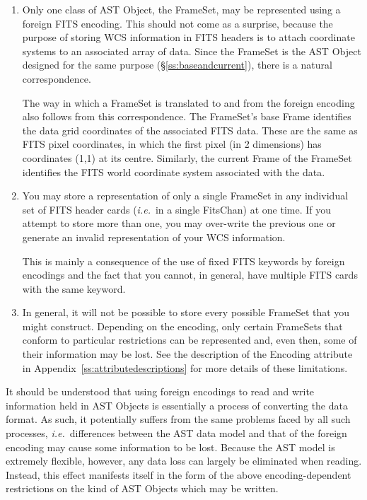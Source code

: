 \documentclass[twoside,11pt]{starlink}
\providecommand{\appref}[1]{Appendix~\ref{#1}}
\providecommand{\secref}[1]{\S\ref{#1}}
\begin{document}
\begin{enumerate}
\item Only one class of AST Object, the FrameSet, may be represented
using a foreign FITS encoding. This should not come as a surprise,
because the purpose of storing WCS information in FITS headers is to
attach coordinate systems to an associated array of data. Since the
FrameSet is the AST Object designed for the same purpose
(\secref{ss:baseandcurrent}), there is a natural correspondence.

The way in which a FrameSet is translated to and from the foreign
encoding also follows from this correspondence. The FrameSet's base
Frame identifies the data grid coordinates of the associated FITS
data. These are the same as FITS pixel coordinates, in which the first
pixel (in 2 dimensions) has coordinates (1,1) at its
centre. Similarly, the current Frame of the FrameSet identifies the
FITS world coordinate system associated with the data.

\item You may store a representation of only a single FrameSet in any
individual set of FITS header cards (\emph{i.e.}\ in a single
FitsChan) at one time. If you attempt to store more than one, you may
over-write the previous one or generate an invalid representation of
your WCS information.

This is mainly a consequence of the use of fixed FITS keywords by
foreign encodings and the fact that you cannot, in general, have
multiple FITS cards with the same keyword.

\item In general, it will not be possible to store every possible
FrameSet that you might construct. Depending on the encoding, only
certain FrameSets that conform to particular restrictions can be
represented and, even then, some of their information may be lost. See
the description of the Encoding attribute in
\appref{ss:attributedescriptions} for more details of these
limitations.
\end{enumerate}

It should be understood that using foreign encodings to read and write
information held in AST Objects is essentially a process of converting
the data format. As such, it potentially suffers from the same
problems faced by all such processes, \emph{i.e.}\ differences between
the AST data model and that of the foreign encoding may cause some
information to be lost.  Because the AST model is extremely flexible,
however, any data loss can largely be eliminated when reading.
Instead, this effect manifests itself in the form of the above
encoding-dependent restrictions on the kind of AST Objects which may
be written.
\end{document}
